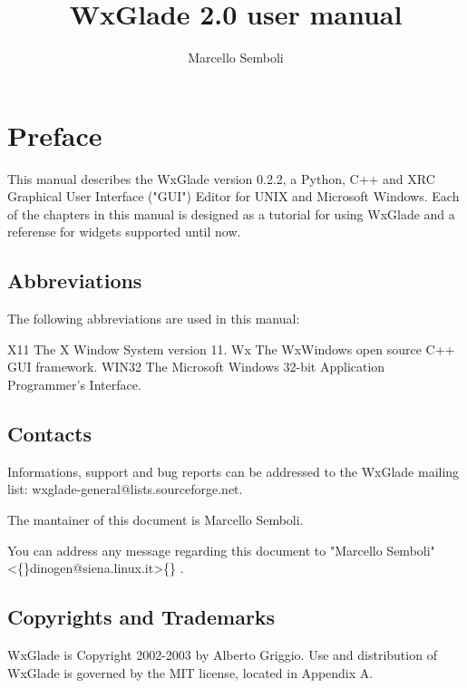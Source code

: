 \documentclass[a4paper,10pt]{book}
\title{WxGlade 2.0 user manual}
\author{Marcello Semboli}
\begin{document}
    
\maketitle
\tableofcontents        
        
\chapter{Preface}
            This manual describes the WxGlade version 0.2.2, a Python,  C++
             and XRC Graphical User Interface ("GUI") Editor for UNIX and
             Microsoft Windows. Each of the chapters in this manual is designed
             as a tutorial for using WxGlade and a referense for widgets
             supported until now.
            
            
\section{Abbreviations}
                The following abbreviations are used in this manual:
                
                X11
                    The X Window System version 11.
                Wx
                    The WxWindows open source C++ GUI framework.
                WIN32
                    The Microsoft Windows 32-bit Application Programmer's Interface.
                
\section{Contacts}
                    Informations, support and bug reports can be addressed to the
                     WxGlade mailing list: 
                    wxglade-general@lists.sourceforge.net.
                    
                    
                    The mantainer of this document is Marcello Semboli. 
                    
                    
                    
                    
                    You can address any message regarding this document to "Marcello
                     Semboli" \textless\{\}dinogen@siena.linux.it\textgreater\{\}
                     . 
                    
                    
                    
\section{	Copyrights and Trademarks}
                        WxGlade is Copyright 2002-2003 by Alberto Griggio. Use and distribution
                         of WxGlade is governed by the MIT license, located in Appendix
                         A.
                        
\end{document}
